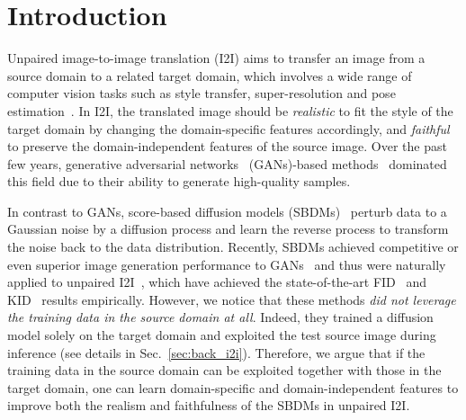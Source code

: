 \documentclass{article}
\begin{document}
\section{Introduction}
Unpaired image-to-image translation (I2I) aims to transfer an image from a source domain to a related target domain, which involves a wide range of computer vision tasks such as style transfer, super-resolution and pose estimation~\cite{pang2021image}.  In I2I, the translated image should be \emph{realistic} to fit the style of the target domain by changing the domain-specific features accordingly, and \emph{faithful} to preserve the domain-independent features of the source image. Over the past few years, generative adversarial networks~\cite{goodfellow2014generative} (GANs)-based methods~\cite{fu2019geometry,zhu2017unpaired,yi2017dualgan,park2020contrastive,benaim2017one,zheng2021spatially,shen2019towards,jiang2020tsit,huang2018multimodal,lee2018diverse,fu2019geometry} dominated this field due to their ability to generate high-quality samples. 

In contrast to GANs, score-based diffusion models (SBDMs)~\cite{song2019generative,ho2020denoising,nichol2021improved,song2020score,bao2021analytic,lu2022dpm} perturb data to a Gaussian noise by a diffusion process and learn the reverse process to transform the noise back to the data distribution. Recently, SBDMs achieved competitive or even superior image generation performance to GANs~\cite{dhariwal2021diffusion} and thus were naturally applied to unpaired I2I~\cite{choi2021ilvr,meng2021sdedit},
which have achieved the state-of-the-art FID~\cite{heusel2017gans} and  KID~\cite{binkowski2018demystifying} results empirically. However, we notice that these methods \emph{did not leverage the training data in the source domain at all}. Indeed, they trained a diffusion model solely on the target domain and exploited the test source image during inference (see details in Sec.~\ref{sec:back_i2i}). Therefore, we argue that if the training data in the source domain can be exploited together with those in the target domain, one can learn domain-specific and domain-independent features to improve both the realism and faithfulness of the SBDMs in unpaired I2I.
 
\end{document}
